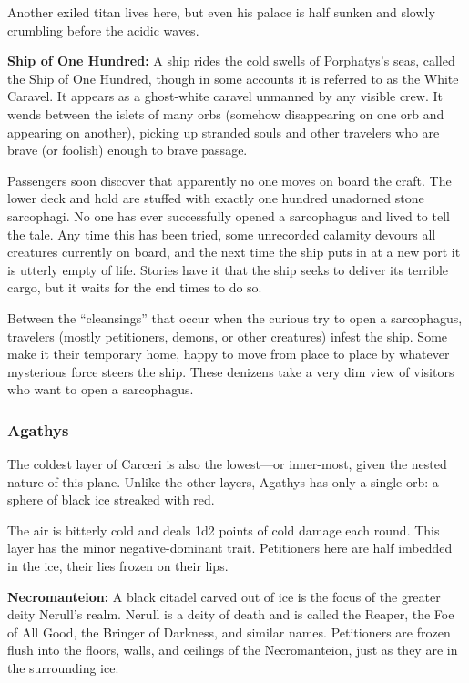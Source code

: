 Another exiled titan lives here, but even his palace is half sunken and slowly crumbling before the acidic waves.

\textbf{Ship of One Hundred:} A ship rides the cold swells of Porphatys's seas, called the Ship of One Hundred, though in some accounts it is referred to as the White Caravel. It appears as a ghost-white caravel unmanned by any visible crew. It wends between the islets of many orbs (somehow disappearing on one orb and appearing on another), picking up stranded souls and other travelers who are brave (or foolish) enough to brave passage.

Passengers soon discover that apparently no one moves on board the craft. The lower deck and hold are stuffed with exactly one hundred unadorned stone sarcophagi. No one has ever successfully opened a sarcophagus and lived to tell the tale. Any time this has been tried, some unrecorded calamity devours all creatures currently on board, and the next time the ship puts in at a new port it is utterly empty of life. Stories have it that the ship seeks to deliver its terrible cargo, but it waits for the end times to do so.

Between the ``cleansings'' that occur when the curious try to open a sarcophagus, travelers (mostly petitioners, demons, or other creatures) infest the ship. Some make it their temporary home, happy to move from place to place by whatever mysterious force steers the ship. These denizens take a very dim view of visitors who want to open a sarcophagus.

\subsubsection{Agathys}
The coldest layer of Carceri is also the lowest---or inner-most, given the nested nature of this plane. Unlike the other layers, Agathys has only a single orb: a sphere of black ice streaked with red.

The air is bitterly cold and deals 1d2 points of cold damage each round. This layer has the minor negative-dominant trait. Petitioners here are half imbedded in the ice, their lies frozen on their lips.

\textbf{Necromanteion:} A black citadel carved out of ice is the focus of the greater deity Nerull's realm. Nerull is a deity of death and is called the Reaper, the Foe of All Good, the Bringer of Darkness, and similar names. Petitioners are frozen flush into the floors, walls, and ceilings of the Necromanteion, just as they are in the surrounding ice.

